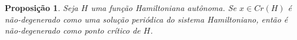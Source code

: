 \documentclass[12pt]{book}
\newtheorem{proposicao}[teorema]{Proposição}
\newenvironment{prova}[1]{$\square$ #1}{\hfill$\blacksquare$}
\newcommand{\derivadaparcialdois}[2]{\frac{\partial^{2} #1}{\partial #2^{2}}}
\newcommand{\derivadaparcialdoisdois}[3]{\frac{\partial^{2} #1}{\partial #2 \partial#3}}
\newcommand{\estruturacomplexa}{J_{0}}
\newcommand{\hessianaponto}[2]{\text{Hess}_{#1}(#2)}
\newcommand{\pontoscriticos}[1]{\textit{Cr}(#1)}
\newcommand{\real}[1]{\mathbb{R}^{#1}}
\newcommand{\reta}{\real{}}
\begin{document}
	
	\begin{proposicao}
		Seja $H$ uma função Hamiltoniana autônoma. Se $x \in \pontoscriticos{H}$ é não-degenerado como uma solução periódica do sistema Hamiltoniano, então é não-degenerado como ponto crítico de $H$.
	\end{proposicao}
\end{document}
